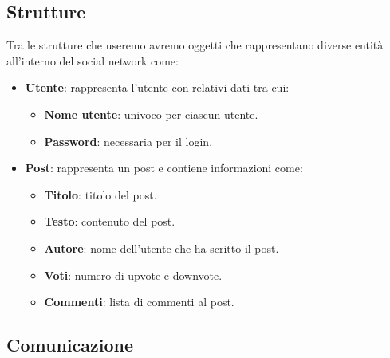 \subsection{Strutture}
Tra le strutture che useremo avremo oggetti che rappresentano diverse entit\`a all'interno del social network come:
\begin{itemize}
	\item \textbf{Utente}: rappresenta l'utente con relativi dati tra cui:
	      \begin{itemize}
		      \item \textbf{Nome utente}: univoco per ciascun utente.
		      \item \textbf{Password}: necessaria per il login.
	      \end{itemize}
	\item \textbf{Post}: rappresenta un post e contiene informazioni come:
	      \begin{itemize}
		      \item \textbf{Titolo}: titolo del post.
		      \item \textbf{Testo}: contenuto del post.
		      \item \textbf{Autore}: nome dell'utente che ha scritto il post.
		      \item \textbf{Voti}: numero di upvote e downvote.
		      \item \textbf{Commenti}: lista di commenti al post.
	      \end{itemize}
\end{itemize}

\subsection{Comunicazione}
